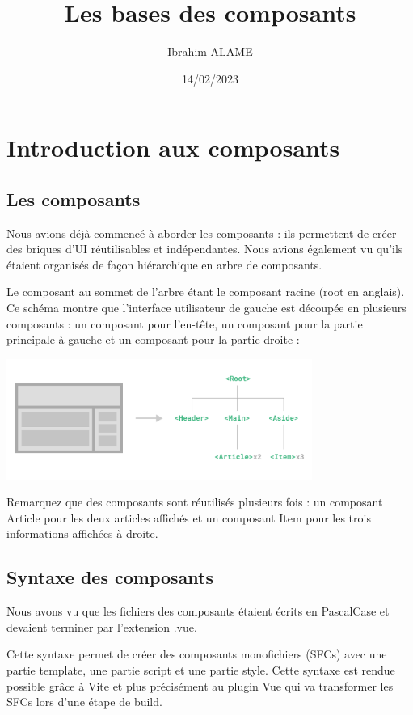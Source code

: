 \documentclass{article}
\title{Les bases des composants}
\author{Ibrahim ALAME}
\date{14/02/2023}
\begin{document}
\maketitle

\section{Introduction aux composants}
\subsection{Les composants}
Nous avions déjà commencé à aborder les composants : ils permettent de créer des briques d'{\color{monOrange}UI} réutilisables et indépendantes. Nous avions également vu qu'ils étaient organisés de façon hiérarchique en arbre de composants.

Le composant au sommet de l'arbre étant le composant racine ({\color{monOrange}root} en anglais). Ce schéma montre que l'interface utilisateur de gauche est découpée en plusieurs composants : un composant pour l'en-tête, un composant pour la partie principale à gauche et un composant pour la partie droite :

\begin{center}
\includegraphics[width=10cm]{images/image08.png}
\end{center}

Remarquez que des composants sont réutilisés plusieurs fois : un composant {\color{monOrange}Article} pour les deux articles affichés et un composant {\color{monOrange}Item} pour les trois informations affichées à droite.

\subsection{Syntaxe des composants}
Nous avons vu que les fichiers des composants étaient écrits en {\color{monOrange}PascalCase} et devaient terminer par l'extension {\color{monOrange}.vue}.

Cette syntaxe permet de créer des composants monofichiers ({\color{monOrange}SFCs}) avec une partie {\color{monOrange}template}, une partie script et une partie style. Cette syntaxe est rendue possible grâce à {\color{monOrange}Vite} et plus précisément au {\color{monOrange}plugin Vue} qui va transformer les {\color{monOrange}SFCs} lors d'une étape de {\color{monOrange}build}.
\end{document}
